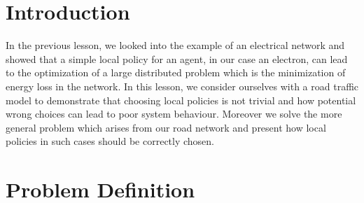 

\newcommand{\x}{\mathbf{x}}
\newcommand{\y}{\mathbf{y}}
\newcommand{\z}{\mathbf{z}}
\newcommand{\blambda}{\boldsymbol{\lambda}}
\newcommand{\bmu}{\boldsymbol{\mu}}
\usepackage{color}



\section{Introduction}

In the previous lesson, we looked into the example of an electrical network and showed that a simple local policy for an agent, in our case an electron, can lead to the optimization of a large distributed problem which is the minimization of energy loss in the  network. In this lesson, we consider ourselves with a road traffic model to demonstrate that choosing local policies is not trivial and how potential wrong choices can lead to poor system behaviour. Moreover we solve the more general problem which arises from our road network and present how local policies in such cases should be correctly chosen.

\section{Problem Definition}

